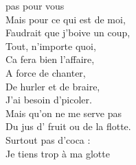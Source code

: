 
 pas pour vous
\\Mais pour ce qui est de moi,
\\Faudrait que j'boive un coup,
\\Tout, n'importe quoi,
\\Ca fera bien l'affaire,
\\A force de chanter,
\\De hurler et de braire,
\\J'ai besoin d'picoler.
\\Mais qu'on ne me serve pas
\\Du jus d' fruit ou de la flotte.
\\Surtout pas d'coca :
\\Je tiens trop à ma glotte
